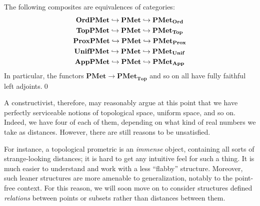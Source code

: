 \documentclass{article}
\def\PMet{\mathbf{PMet}}
\def\PMetTop{\mathbf{PMet}_{\mathbf{Top}}}
\def\PMetUnif{\mathbf{PMet}_{\mathbf{Unif}}}
\def\PMetProx{\mathbf{PMet}_{\mathbf{Prox}}}
\def\PMetApp{\mathbf{PMet}_{\mathbf{App}}}
\def\PMetOrd{\mathbf{PMet}_{\mathbf{Ord}}}
\def\TopPMet{\mathbf{TopPMet}}
\def\UnifPMet{\mathbf{UnifPMet}}
\def\ProxPMet{\mathbf{ProxPMet}}
\def\AppPMet{\mathbf{AppPMet}}
\def\OrdPMet{\mathbf{OrdPMet}}
\begin{document}
\begin{cor}
  The following composites are equivalences of categories:
  \begin{gather*}
    \OrdPMet \into \PMet \into \PMetOrd\\
    \TopPMet \into \PMet \into \PMetTop\\
    \ProxPMet \into \PMet \into \PMetProx\\
    \UnifPMet \into \PMet \into \PMetUnif\\
    \AppPMet \into \PMet \into \PMetApp
  \end{gather*}
  In particular, the functors $\PMet \to \PMetTop$ and so on all have fully faithful left adjoints.\qed
\end{cor}

A constructivist, therefore, may reasonably argue at this point that we have perfectly serviceable notions of topological space, uniform space, and so on.
Indeed, we have four of each of them, depending on what kind of real numbers we take as distances.
However, there are still reasons to be unsatisfied.

For instance, a topological prometric is an \emph{immense} object, containing all sorts of strange-looking distances; it is hard to get any intuitive feel for such a thing.
It is much easier to understand and work with a less ``flabby'' structure.
Moreover, such leaner structures are more amenable to generalization, notably to the point-free context.
For this reason, we will soon move on to consider structures defined \emph{relations} between points or subsets rather than distances between them.
\end{document}
